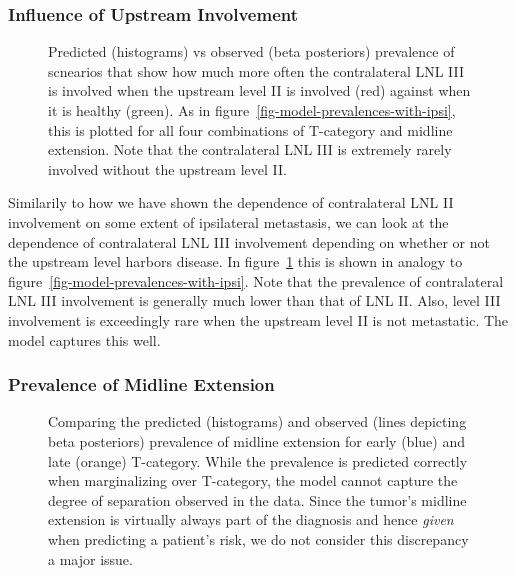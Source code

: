 \documentclass[
  sn-mathphys-num,
]{sn-jnl}
\begin{document}
\subsubsection{Influence of Upstream
Involvement}\label{influence-of-upstream-involvement}

\begin{figure}


\caption{\label{fig-model-prevalences-with-upstream}Predicted
(histograms) vs observed (beta posteriors) prevalence of scnearios that
show how much more often the contralateral LNL III is involved when the
upstream level II is involved (red) against when it is healthy (green).
As in figure~\ref{fig-model-prevalences-with-ipsi}, this is plotted for
all four combinations of T-category and midline extension. Note that the
contralateral LNL III is extremely rarely involved without the upstream
level II.}

\end{figure}%

Similarily to how we have shown the dependence of contralateral LNL II
involvement on some extent of ipsilateral metastasis, we can look at the
dependence of contralateral LNL III involvement depending on whether or
not the upstream level harbors disease. In
figure~\ref{fig-model-prevalences-with-upstream} this is shown in
analogy to figure~\ref{fig-model-prevalences-with-ipsi}. Note that the
prevalence of contralateral LNL III involvement is generally much lower
than that of LNL II. Also, level III involvement is exceedingly rare
when the upstream level II is not metastatic. The model captures this
well.

\subsubsection{Prevalence of Midline
Extension}\label{prevalence-of-midline-extension}

\begin{figure}


\caption{\label{fig-model-prevalences-midext}Comparing the predicted
(histograms) and observed (lines depicting beta posteriors) prevalence
of midline extension for early (blue) and late (orange) T-category.
While the prevalence is predicted correctly when marginalizing over
T-category, the model cannot capture the degree of separation observed
in the data. Since the tumor's midline extension is virtually always
part of the diagnosis and hence \emph{given} when predicting a patient's
risk, we do not consider this discrepancy a major issue.}

\end{figure}%
\end{document}
